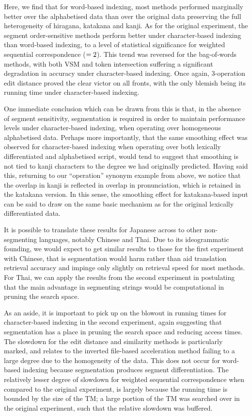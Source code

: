 Here, we find that for word-based indexing, most methods performed
marginally better over the alphabetised data than over the original
data preserving the full heterogeneity of hiragana, katakana and kanji.
As for the original experiment, the segment order-sensitive methods
perform better under character-based indexing than word-based indexing,
to a level of statistical significance for weighted sequential
correspondence ($=2$). This trend was reversed for the bag-of-words
methods, with both VSM and token intersection suffering a significant
degradation in accuracy under character-based indexing. Once again,
3-operation edit distance proved the clear victor on all fronts, with
the only blemish being its running time under character-based indexing.

One immediate conclusion which can be drawn from this is that, in the
absence of segment sensitivity, segmentation is required in order to
maintain performance levels under character-based indexing, when
operating over homogeneous alphabetised data. Perhaps more importantly,
that the same smoothing effect was observed for character-based indexing
when operating over both lexically differentiated and alphabetised
script, would tend to suggest that smoothing is not tied to kanji
characters to the degree we had originally predicted. Having said this,
returning to our ``operation'' synonym example from above, we notice
that the overlap in kanji is reflected in overlap in pronunciation,
which is retained in the katakana version. In this sense, the smoothing
effect for katakana-based input can be said to draw on the same basic
mechanism as for the original lexically differentiated data.

It is possible to translate these results for Japanese across to other
non-segmenting languages, notably Chinese and Thai. Due to its
ideogrammatic founding, we would expect to get similar results to those
for the first experiment with Chinese, that is segmentation would harm
rather than aid translation retrieval accuracy and impinge only slightly 
on retrieval speed for most methods. For Thai, we can apply the results
from the second experiment in postulating that the main advantage in
segmenting strings would be computational in pruning the search space.

As an aside, it is important to pick up on the blowout in running times
for character-based indexing in the second experiment, again suggesting
that segmentation has a place in pruning the search space and reducing
access times. The slowdown for the edit distance and similarity methods
is particularly marked, and relates to the inverted file-based
acceleration method failing to a large degree due to the homogeneity of
the data. This does not occur for word-based indexing because
segmentation produces segment differentiation. The relatively lesser
degree of slowdown for weighted sequential correspondence when compared
to the original experiment, is largely because the running time is
bounded by the size of the TM; a large portion of the TM was searched
over in the original experiment, such that the relative slowdown was
buffered.


